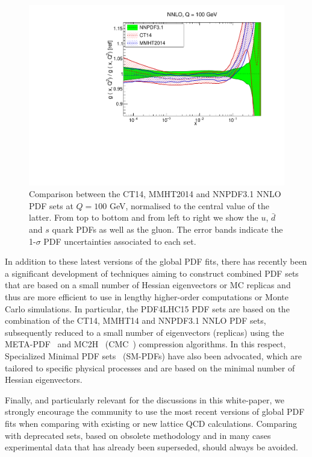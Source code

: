 \begin{figure}[t]
\begin{center}
   \includegraphics[scale=0.35]{plots/xg-31-nnlo-globalfits.pdf}
  \caption{\small Comparison between the CT14, MMHT2014
  and NNPDF3.1 NNLO PDF sets at $Q=100$ GeV, normalised
  to the central value of the latter.
  From top to bottom and from left to right we show the
  $u$, $\bar{d}$ and $s$ quark PDFs as well as the gluon.
  The error bands indicate the 1-$\sigma$ PDF uncertainties
  associated to each set.
    \label{fig:globalfits}
  }
\end{center}
\end{figure}

In addition to these latest versions of the global PDF fits,
there has recently been a significant development of techniques aiming
to construct combined PDF sets that are based on
a small number of Hessian eigenvectors or MC replicas and thus
are more efficient to use in lengthy higher-order
computations or Monte Carlo simulations.
%
In particular, the PDF4LHC15 PDF sets are based on the
combination of the CT14, MMHT14 and NNPDF3.1 NNLO PDF sets,
subsequently reduced to a small number of eigenvectors
(replicas) using the META-PDF~\cite{Gao:2013bia}
and MC2H~\cite{Carrazza:2015aoa}
(CMC~\cite{Carrazza:2015hva}) compression algorithms.
%
In this respect, Specialized Minimal PDF sets~\cite{Carrazza:2016htc}
(SM-PDFs) have also
been advocated, which
are tailored to specific physical processes and are based
on the minimal number of Hessian eigenvectors.

Finally, and particularly relevant for the discussions in this white-paper,
we strongly encourage the community to use the most recent versions
of global PDF fits when comparing with existing or new
lattice QCD calculations.
%
Comparing with deprecated sets, based on obsolete methodology
and in many cases experimental data that has already been
superseded, should always be avoided.
